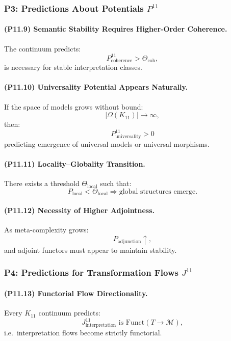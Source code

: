 \subsubsection{P3: Predictions About Potentials $P^{11}$}

\paragraph{(P11.9) Semantic Stability Requires Higher-Order Coherence.}
The continuum predicts:
\[
P_{\mathrm{coherence}}^{11} > \Theta_{\mathrm{coh}},
\]
is necessary for stable interpretation classes.

\paragraph{(P11.10) Universality Potential Appears Naturally.}
If the space of models grows without bound:
\[
|\Omega(K_{11})| \to \infty,
\]
then:
\[
P_{\mathrm{universality}}^{11} > 0
\]
predicting emergence of universal models or universal morphisms.

\paragraph{(P11.11) Locality–Globality Transition.}
There exists a threshold $\Theta_{\mathrm{local}}$ such that:
\[
P_{\mathrm{local}} < \Theta_{\mathrm{local}}
\Rightarrow 
\text{global structures emerge}.
\]

\paragraph{(P11.12) Necessity of Higher Adjointness.}
As meta-complexity grows:
\[
P_{\mathrm{adjunction}} \uparrow,
\]
and adjoint functors must appear to maintain stability.

\subsubsection{P4: Predictions for Transformation Flows $J^{11}$}

\paragraph{(P11.13) Functorial Flow Directionality.}
Every $K_{11}$ continuum predicts:
\[
J_{\mathrm{interpretation}}^{11}
\text{ is } \mathrm{Funct}(T \to \mathcal{M}),
\]
i.e.\ interpretation flows become strictly functorial.

